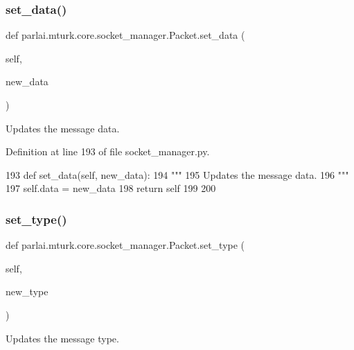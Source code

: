 \subsubsection{\texorpdfstring{set\+\_\+data()}{set\_data()}}
{\footnotesize\ttfamily def parlai.\+mturk.\+core.\+socket\+\_\+manager.\+Packet.\+set\+\_\+data (\begin{DoxyParamCaption}\item[{}]{self,  }\item[{}]{new\+\_\+data }\end{DoxyParamCaption})}

\begin{DoxyVerb}Updates the message data.
\end{DoxyVerb}
 

Definition at line 193 of file socket\+\_\+manager.\+py.


\begin{DoxyCode}
193     \textcolor{keyword}{def }set\_data(self, new\_data):
194         \textcolor{stringliteral}{"""}
195 \textcolor{stringliteral}{        Updates the message data.}
196 \textcolor{stringliteral}{        """}
197         self.data = new\_data
198         \textcolor{keywordflow}{return} self
199 
200 
\end{DoxyCode}
\mbox{\label{classparlai_1_1mturk_1_1core_1_1socket__manager_1_1Packet_a1269876ae5939e52c10fe4526d50cde4}} 
\subsubsection{\texorpdfstring{set\+\_\+type()}{set\_type()}}
{\footnotesize\ttfamily def parlai.\+mturk.\+core.\+socket\+\_\+manager.\+Packet.\+set\+\_\+type (\begin{DoxyParamCaption}\item[{}]{self,  }\item[{}]{new\+\_\+type }\end{DoxyParamCaption})}

\begin{DoxyVerb}Updates the message type.
\end{DoxyVerb}
 

